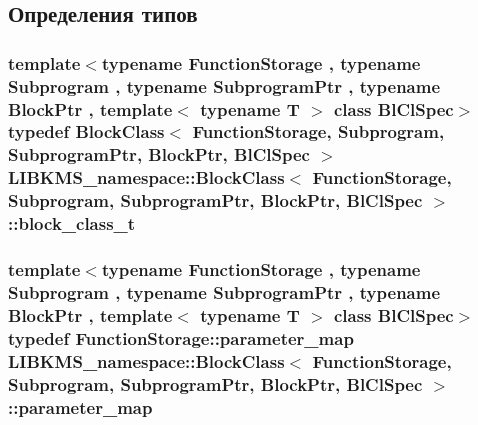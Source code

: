 \subsection{Определения типов}
\hypertarget{classLIBKMS__namespace_1_1BlockClass_a505cb3abde8bf16a22913254fe5236a8}{
\subsubsection[{block\-\_\-class\-\_\-t}]{\setlength{\rightskip}{0pt plus 5cm}template$<$typename Function\-Storage , typename Subprogram , typename Subprogram\-Ptr , typename Block\-Ptr , template$<$ typename T $>$ class Bl\-Cl\-Spec$>$ typedef {\bf Block\-Class}$<$ {\bf Function\-Storage}, {\bf Subprogram}, Subprogram\-Ptr, Block\-Ptr, Bl\-Cl\-Spec $>$ {\bf L\-I\-B\-K\-M\-S\-\_\-namespace\-::\-Block\-Class}$<$ {\bf Function\-Storage}, {\bf Subprogram}, Subprogram\-Ptr, Block\-Ptr, Bl\-Cl\-Spec $>$\-::{\bf block\-\_\-class\-\_\-t}}}\label{classLIBKMS__namespace_1_1BlockClass_a505cb3abde8bf16a22913254fe5236a8}
\hypertarget{classLIBKMS__namespace_1_1BlockClass_a3cd7da1e7c30b9f047e99b6c1c433ff4}{
\subsubsection[{parameter\-\_\-map}]{\setlength{\rightskip}{0pt plus 5cm}template$<$typename Function\-Storage , typename Subprogram , typename Subprogram\-Ptr , typename Block\-Ptr , template$<$ typename T $>$ class Bl\-Cl\-Spec$>$ typedef {\bf Function\-Storage\-::parameter\-\_\-map} {\bf L\-I\-B\-K\-M\-S\-\_\-namespace\-::\-Block\-Class}$<$ {\bf Function\-Storage}, {\bf Subprogram}, Subprogram\-Ptr, Block\-Ptr, Bl\-Cl\-Spec $>$\-::{\bf parameter\-\_\-map}}}\label{classLIBKMS__namespace_1_1BlockClass_a3cd7da1e7c30b9f047e99b6c1c433ff4}

